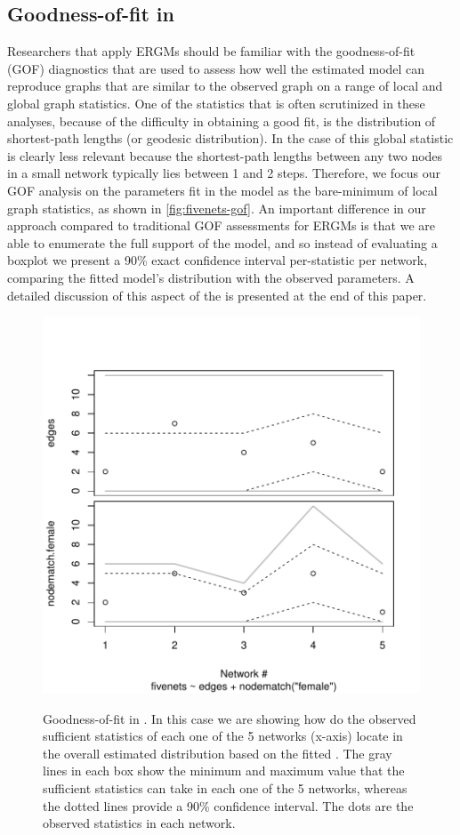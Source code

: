 \documentclass[12pt]{article}
\begin{document}


\subsection{Goodness-of-fit in \ergmitos}

Researchers that apply ERGMs should be familiar with the goodness-of-fit (GOF) diagnostics that are used to assess how well the estimated model can reproduce graphs that are similar to the observed graph on a range of local and global graph statistics. One of the statistics that is often scrutinized in these analyses, because of the difficulty in obtaining a good fit, is the distribution of shortest-path lengths (or geodesic distribution). In the case of \ergmitos{} this global statistic is clearly less relevant because the shortest-path lengths between any two nodes in a small network typically lies between 1 and 2 steps. Therefore, we focus our GOF analysis on the parameters fit in the model as the bare-minimum of local graph statistics, as shown in \autoref{fig:fivenets-gof}. An important difference in our approach compared to traditional GOF assessments for ERGMs is that we are able to enumerate the full support of the model, and so instead of evaluating a boxplot we present a 90\% exact confidence interval per-statistic per network, comparing the fitted model's distribution with the observed parameters. A detailed discussion of this aspect of the \ergmitos{} is presented at the end of this paper.

\begin{figure}[tb]
    \centering
    \caption{Goodness-of-fit in \ergmitos{}. In this case we are showing how do the observed sufficient statistics of each one of the 5 networks (x-axis) locate in the overall estimated distribution based on the fitted \ergmito{}. The gray lines in each box show the minimum and maximum value that the sufficient statistics can take in each one of the 5 networks, whereas the dotted lines provide a 90\% confidence interval. The dots are the observed statistics in each network.}
    \includegraphics[width=.7\linewidth]{figures/fivenets_gof.pdf}
    \label{fig:fivenets-gof}
\end{figure}
\end{document}
